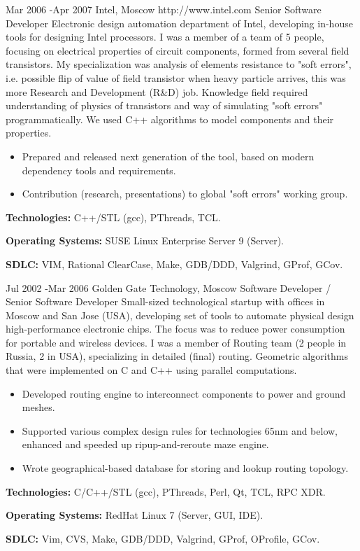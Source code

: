 \documentclass[10pt]{article} %
\begin{document}
\job
{Mar 2006 -}{Apr 2007}
{Intel, Moscow}
{http://www.intel.com}
{Senior Software Developer}
{Electronic design automation department of Intel, developing in-house tools for designing Intel processors.
I was a member of a team of 5 people, focusing on electrical properties of circuit components, formed from several 
field transistors. My specialization was analysis of elements resistance to "soft errors", i.e. possible
flip of value of field transistor when heavy particle arrives, this was more Research and Development (R\&D) job.
Knowledge field required understanding of physics of transistors and way of simulating "soft errors" programmatically.
We used C++ algorithms to model components and their properties.}
{\begin{itemize}
\item{Prepared and released next generation of the tool, based on modern dependency tools and requirements.}
\item{Contribution (research, presentations) to global "soft errors" working group.}
\end{itemize}}
{\rule{0mm}{5mm}\textbf{Technologies:} C++/STL (gcc), PThreads, TCL.\\
\rule{0mm}{5mm}\textbf{Operating Systems:} SUSE Linux Enterprise Server 9 (Server).\\
\rule{0mm}{5mm}\textbf{SDLC:} VIM, Rational ClearCase, Make, GDB/DDD, Valgrind, GProf, GCov.
}


\job
{Jul 2002 -}{Mar 2006}
{Golden Gate Technology, Moscow}
{}
{Software Developer / Senior Software Developer}
{Small-sized technological startup with offices in Moscow and San Jose (USA), developing set of tools
to automate physical design high-performance electronic chips. The focus was to reduce power consumption
for portable and wireless devices. I was a member of Routing team (2 people in Russia, 2 in USA),
specializing in detailed (final) routing. Geometric algorithms that were implemented on C and C++ using parallel computations.}
{\begin{itemize}
\item{Developed routing engine to interconnect components to power and ground meshes.}
\item{Supported various complex design rules for technologies 65nm and below, enhanced and speeded up ripup-and-reroute maze engine.}
\item{Wrote geographical-based database for storing and lookup routing topology.}
\end{itemize}}
{\rule{0mm}{5mm}\textbf{Technologies:} C/C++/STL (gcc), PThreads, Perl, Qt, TCL, RPC XDR.\\
\rule{0mm}{5mm}\textbf{Operating Systems:} RedHat Linux 7 (Server, GUI, IDE).\\
\rule{0mm}{5mm}\textbf{SDLC:} Vim, CVS, Make, GDB/DDD, Valgrind, GProf, OProfile, GCov.
}
\end{document}
